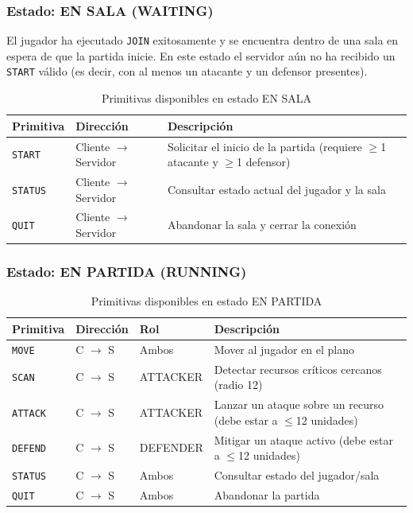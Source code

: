 \documentclass[12pt, letterpaper]{article}
\begin{document}
\subsubsection{Estado: EN SALA (WAITING)}

El jugador ha ejecutado \texttt{JOIN} exitosamente y se encuentra dentro de una sala
en espera de que la partida inicie. En este estado el servidor aún no ha recibido un
\texttt{START} válido (es decir, con al menos un atacante y un defensor presentes).

\begin{table}[H]
\centering
\begin{tabularx}{\textwidth}{l l X}
\toprule
\textbf{Primitiva} & \textbf{Dirección} & \textbf{Descripción} \\
\midrule
\texttt{START}  & Cliente $\rightarrow$ Servidor & Solicitar el inicio de la partida (requiere $\geq$1 atacante y $\geq$1 defensor) \\
\texttt{STATUS} & Cliente $\rightarrow$ Servidor & Consultar estado actual del jugador y la sala \\
\texttt{QUIT}   & Cliente $\rightarrow$ Servidor & Abandonar la sala y cerrar la conexión \\
\bottomrule
\end{tabularx}
\caption{Primitivas disponibles en estado EN SALA}
\end{table}

\subsubsection{Estado: EN PARTIDA (RUNNING)}

\begin{table}[H]
\centering
\begin{tabularx}{\textwidth}{l l l X}
\toprule
\textbf{Primitiva} & \textbf{Dirección} & \textbf{Rol} & \textbf{Descripción} \\
\midrule
\texttt{MOVE}   & C $\rightarrow$ S & Ambos    & Mover al jugador en el plano \\
\texttt{SCAN}   & C $\rightarrow$ S & ATTACKER & Detectar recursos críticos cercanos (radio 12) \\
\texttt{ATTACK} & C $\rightarrow$ S & ATTACKER & Lanzar un ataque sobre un recurso (debe estar a $\leq$12 unidades) \\
\texttt{DEFEND} & C $\rightarrow$ S & DEFENDER & Mitigar un ataque activo (debe estar a $\leq$12 unidades) \\
\texttt{STATUS} & C $\rightarrow$ S & Ambos    & Consultar estado del jugador/sala \\
\texttt{QUIT}   & C $\rightarrow$ S & Ambos    & Abandonar la partida \\
\bottomrule
\end{tabularx}
\caption{Primitivas disponibles en estado EN PARTIDA}
\end{table}
\end{document}
